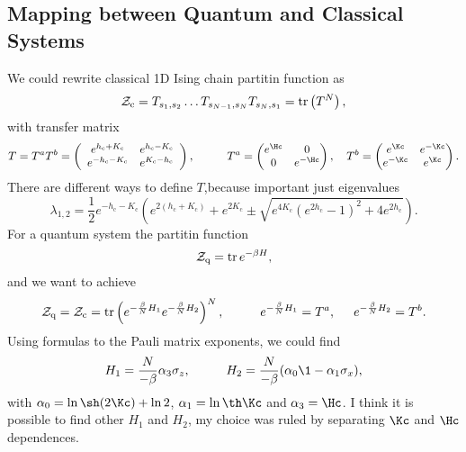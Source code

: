 \subsection{Mapping between Quantum and Classical Systems}

We could rewrite classical 1D Ising chain partitin function as
\begin{equation*}
	\mathcal{Z}_{\textnormal{c}} = T_{s_1,s_2} \ldots T_{s_{N-1},s_{N}} T_{s_N, s_1} = \mathop{\mathrm{tr}}\nolimits\left(T^N\right),
\end{equation*}
with transfer matrix
\begin{equation*}
	T = T^a T^b = \left(
\begin{array}{cc}
 e^{h_\text{c}+K_\text{c}} & e^{h_\text{c}-K_\text{c}} \\
 e^{-h_\text{c}-K_\text{c}} & e^{K_\text{c}-h_\text{c}} \\
\end{array}
\right),
	\hspace{10mm}
	T^a = \begin{pmatrix}
	    e^{\Hc} & 0 \\
	    0 & e^{-\Hc} \\
	\end{pmatrix} 
	,\ \ \ 
	T^{b} = \begin{pmatrix}
	    e^{\Kc } & e^{-\Kc } \\
	    e^{-\Kc } & e^{\Kc } \\
	\end{pmatrix}.
\end{equation*}
There are different ways to define $T$,because important just eigenvalues
\begin{equation*}
	\lambda_{1,2} = \frac{1}{2} e^{-h_{\text{c}}-K_{\text{c}}} \left(e^{2 \left(h_{\text{c}}+K_{\text{c}}\right)}+e^{2 K_{\text{c}}} \pm \sqrt{ e^{4 K_{\text{c}}} \left(e^{2 h_{\text{c}}}-1\right)^2 +4 e^{2 h_{\text{c}}}}\right).
\end{equation*}
For a quantum system the partitin function 
\begin{equation*}
	\mathcal{Z}_{\textnormal{q}} = \mathop{\mathrm{tr}}\nolimits e^{-\beta H},
\end{equation*}
and we want to achieve
\begin{equation*}
	\sub{\mathcal{Z}}{q} = \sub{\mathcal{Z}}{c} = \tr\left(
		e^{-\frac{\beta}{N}H_1} e^{-\frac{\beta}{N}H_2}
	\right)^N,
	\hspace{10 mm} 
	e^{- \frac{\beta}{N} H_1} = T^a,
	\hspace{5 mm} 
	e^{- \frac{\beta}{N} H_2} = T^b.
\end{equation*}
Using formulas to the Pauli matrix exponents, we could find
\begin{equation*}
	H_1 = \frac{N}{-\beta} \alpha_3 \sigma_z,
	\hspace{10 mm} 
	H_2 = \frac{N}{-\beta} (\alpha_0 \1 - \alpha_1 \sigma_x),
\end{equation*}
with $\alpha_0 = \ln \sh(2 \Kc) + \ln 2$, $\alpha_1 = \ln \th \Kc$ and $\alpha_3 = \Hc$. I think it is possible to find other $H_1$ and $H_2$, my choice was ruled by separating $\Kc$ and $\Hc$ dependences.

